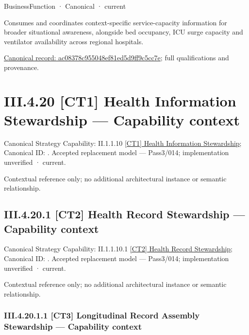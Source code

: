 \label{element:ac08378c955048ef81ed5d9ff9c5cc7e}
{\small BusinessFunction · Canonical · current}\par

Consumes and coordinates context-specific service-capacity information for broader situational awareness, alongside bed occupancy, ICU surge capacity and ventilator availability across regional hospitals.


{\footnotesize \href{../../../../../../../continuum/business/business-function/ac08378c955048ef81ed5d9ff9c5cc7e.md}{Canonical record: ac08378c955048ef81ed5d9ff9c5cc7e}; full qualifications and provenance.}\par
\section*{III.4.20 [CT1] Health Information Stewardship — Capability context}
\label{navigation:III.4.20}

{\small Canonical Strategy Capability: II.1.1.10 \hyperref[element:3ed66006b3424bc086180c6738b1596d]{[CT1] Health Information Stewardship}; Canonical ID: \texttt{}. Accepted replacement model — Pass3/014; implementation unverified · current.}\par
Contextual reference only; no additional architectural instance or semantic relationship.\par
\subsection*{III.4.20.1 [CT2] Health Record Stewardship — Capability context}
\label{navigation:III.4.20.1}

{\small Canonical Strategy Capability: II.1.1.10.1 \hyperref[element:8532e6d5a687459b9defad56f837fa0a]{[CT2] Health Record Stewardship}; Canonical ID: \texttt{}. Accepted replacement model — Pass3/014; implementation unverified · current.}\par
Contextual reference only; no additional architectural instance or semantic relationship.\par
\subsubsection*{III.4.20.1.1 [CT3] Longitudinal Record Assembly Stewardship — Capability context}
\label{navigation:III.4.20.1.1}


